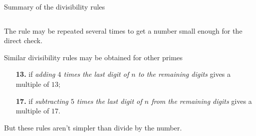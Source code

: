 \documentclass[9pt,aspectratio=169]{beamer}
\begin{document}
\begin{frame}{Summary of the divisibility rules}
\begin{columns}[T]
\begin{column}{0.5\textwidth}
{      The rule may be repeated several times to get a number small enough for the direct check.

      Similar divisibility rules may be obtained for other primes}

      \begin{enumerate}
        \item[\textbf{13.}] if \emph{adding $4$ times the last digit of $n$ to the remaining digits} gives a multiple of $13$;
        \item[\textbf{17.}] if \emph{subtracting $5$ times the last digit of $n$ from the remaining digits} gives a multiple of $17$.
      \end{enumerate}

      {\small But these rules aren't simpler than divide by the number.}
    \end{column}
  \end{columns}
\end{frame}
\end{document}
